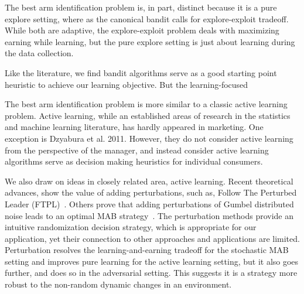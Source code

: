 \documentclass[nonblindrev]{informs3}
\begin{document}
The best arm identification problem is, in part, distinct because it is a pure explore setting, where as the canonical bandit calls for explore-exploit tradeoff. While both are adaptive, the explore-exploit problem deals with maximizing earning while learning, but the pure explore setting is just about learning during the data collection. 

Like the literature, we find bandit algorithms serve as a good starting point heuristic to achieve our learning objective. But the learning-focused 

The best arm identification problem is more similar to a classic active learning problem. Active learning, while an established areas of research in the statistics and machine learning literature, has hardly appeared in marketing. One exception is Dzyabura et al. 2011. However, they do not consider active learning from the perspective of the manager, and instead consider active learning algorithms serve as decision making heuristics for individual consumers. 


We also draw on ideas in closely related area, active learning. Recent theoretical advances, show the value of adding perturbations, such as, Follow The Perturbed Leader (FTPL)~\citep{kalai2005efficient}. Others prove that adding perturbations of Gumbel distributed noise leads to an optimal MAB strategy~\citep{abernethy2015fighting,kujala2005following}. The perturbation methods provide an intuitive randomization decision strategy, which is appropriate for our application, yet their connection to other approaches and applications are limited. Perturbation resolves the learning-and-earning tradeoff for the stochastic MAB setting and improves pure learning for the active learning setting, but it also goes further, and does so in the adversarial setting. This suggests it is a strategy more robust to the non-random dynamic changes in an environment. 
\end{document}
